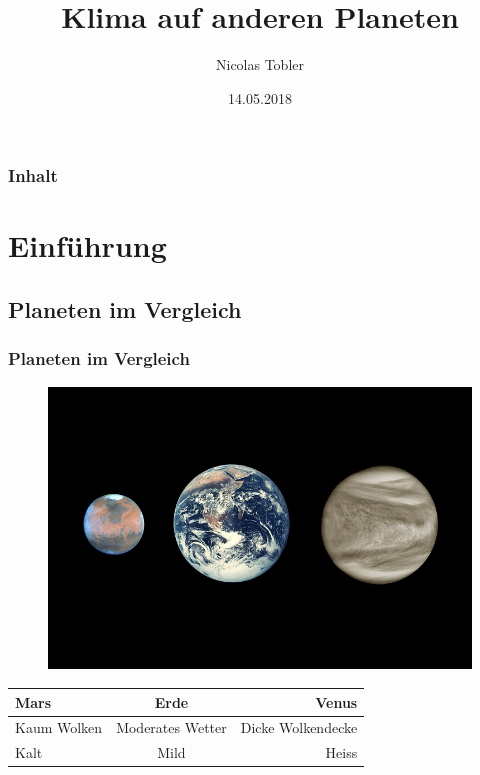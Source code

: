 \documentclass[ngerman]{beamer}
\title{Klima auf anderen Planeten}
\author{Nicolas Tobler}
\institute{Mathematisches Seminar 2018}
\date{14.05.2018}
\begin{document}
\begin{frame}
\titlepage
\end{frame}

\begin{frame}
\frametitle{Inhalt}
\tableofcontents
\end{frame}

\section{Einführung}

\subsection{Planeten im Vergleich}
\begin{frame}
	\frametitle{Planeten im Vergleich}
	
	\begin{figure}
	\center
	\includegraphics[width=0.7\linewidth, trim={0 3cm 0 3cm},clip]{planets.jpg}
	\end{figure}
	
\begin{center}
\begin{tabular}{ l c r }
  Mars & Erde & Venus \\
  \hline
  Kaum Wolken & Moderates Wetter & Dicke Wolkendecke \\
  Kalt & Mild & Heiss \\
\end{tabular}
\end{center}	
	

\end{frame}
\end{document}
